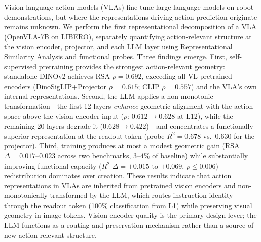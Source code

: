 Vision-language-action models (VLAs) fine-tune large language models on robot demonstrations, but where the representations driving action prediction originate remains unknown.
We perform the first representational decomposition of a VLA (OpenVLA-7B on LIBERO), separately quantifying action-relevant structure at the vision encoder, projector, and each LLM layer using Representational Similarity Analysis and functional probes.
Three findings emerge.
First, self-supervised pretraining provides the strongest action-relevant geometry: standalone DINOv2 achieves RSA $\rho = 0.692$, exceeding all VL-pretrained encoders (DinoSigLIP+Projector $\rho = 0.615$; CLIP $\rho = 0.557$) and the VLA's own internal representations.
Second, the LLM applies a non-monotonic transformation---the first 12 layers \emph{enhance} geometric alignment with the action space above the vision encoder input ($\rho$: $0.612 \to 0.628$ at L12), while the remaining 20 layers degrade it ($0.628 \to 0.422$)---and concentrates a functionally superior representation at the readout token (probe $R^2 = 0.678$ vs.\ $0.630$ for the projector).
Third, training produces at most a modest geometric gain (RSA $\Delta = 0.017$--$0.023$ across two benchmarks, $3$--$4\%$ of baseline) while substantially improving functional capacity ($R^2$ $\Delta = +0.015$ to $+0.069$, $p \leq 0.006$)---redistribution dominates over creation.
These results indicate that action representations in VLAs are inherited from pretrained vision encoders and non-monotonically transformed by the LLM, which routes instruction identity through the readout token (100\% classification from L1) while preserving visual geometry in image tokens.
Vision encoder quality is the primary design lever; the LLM functions as a routing and preservation mechanism rather than a source of new action-relevant structure.
